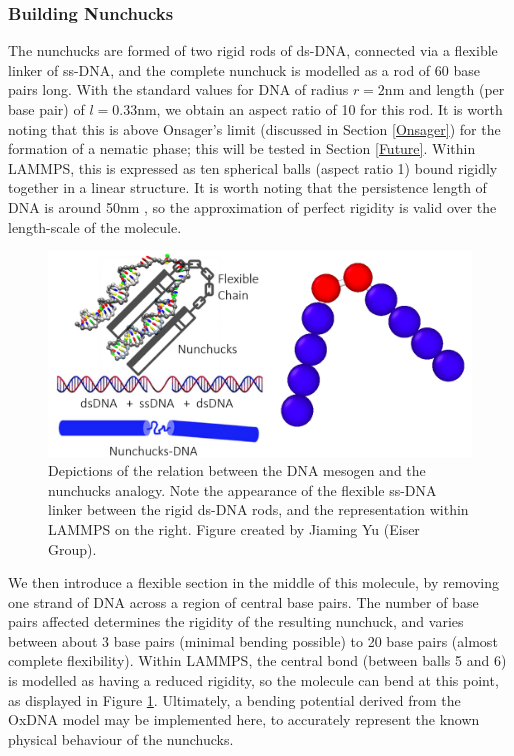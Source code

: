\documentclass[11pt, a4paper]{article} %
\begin{document}
\subsubsection{Building Nunchucks}
The nunchucks are formed of two rigid rods of ds-DNA, connected via a flexible linker of ss-DNA, and the complete nunchuck is modelled as a rod of 60 base pairs long. With the standard values for DNA of radius $r = 2$nm and length (per base pair) of $l=0.33$nm, we obtain an aspect ratio of 10 for this rod. It is worth noting that this is above Onsager's limit (discussed in Section \ref{Onsager}) for the formation of a nematic phase; this will be tested in Section \ref{Future}. Within LAMMPS, this is expressed as ten spherical balls (aspect ratio 1) bound rigidly together in a linear structure. It is worth noting that the persistence length of DNA is around 50nm \cite{Garcia2007}, so the approximation of perfect rigidity is valid over the length-scale of the molecule.

\begin{figure} [h!]
	\centering
	\includegraphics[width=0.7\linewidth]{Figures/nunchucks_combined}%
	\caption{Depictions of the relation between the DNA mesogen and the nunchucks analogy. Note the appearance of the flexible ss-DNA linker between the rigid ds-DNA rods, and the representation within LAMMPS on the right. Figure created by Jiaming Yu (Eiser Group).}
	\label{fig:nunchucks_artist}
\end{figure}

We then introduce a flexible section in the middle of this molecule, by removing one strand of DNA across a region of central base pairs. The number of base pairs affected determines the rigidity of the resulting nunchuck, and varies between about 3 base pairs (minimal bending possible) to 20 base pairs (almost complete flexibility). Within LAMMPS, the central bond (between balls 5 and 6) is modelled as having a reduced rigidity, so the molecule can bend at this point, as displayed in Figure \ref{fig:nunchucks_artist}. Ultimately, a bending potential derived from the OxDNA model may be implemented here, to accurately represent the known physical behaviour of the nunchucks.
\end{document}

